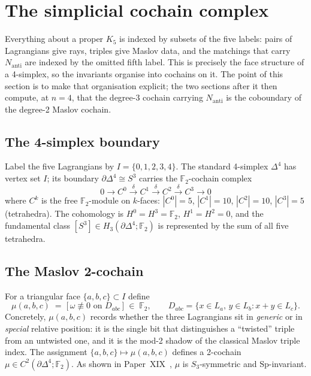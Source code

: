 \documentclass[11pt,a4paper]{article}
\theoremstyle{remark}
\newcommand{\F}{\mathbb{F}}
\newcommand{\Sp}{\mathrm{Sp}}
\newcommand{\Nanti}{N_{\mathrm{anti}}}
\begin{document}
\section{The simplicial cochain complex}\label{sec:setup}

Everything about a proper $K_5$ is indexed by subsets of the five labels:
pairs of Lagrangians give rays, triples give Maslov data, and the matchings
that carry $\Nanti$ are indexed by the omitted fifth label.  This is precisely
the face structure of a 4-simplex, so the invariants organise into cochains on
it.  The point of this section is to make that organisation explicit; the two
sections after it then compute, at $n=4$, that the degree-3 cochain carrying
$\Nanti$ is the coboundary of the degree-2 Maslov cochain.

\subsection{The 4-simplex boundary}

Label the five Lagrangians by $I=\{0,1,2,3,4\}$.  The standard 4-simplex
$\Delta^4$ has vertex set $I$; its boundary $\partial\Delta^4\cong S^3$ carries
the $\F_2$-cochain complex
\[
  0\to C^0 \xrightarrow{\,\delta\,} C^1 \xrightarrow{\,\delta\,} C^2
    \xrightarrow{\,\delta\,} C^3 \to 0
\]
where $C^k$ is the free $\F_2$-module on $k$-faces:
$|C^0|=5$, $|C^1|=10$, $|C^2|=10$, $|C^3|=5$ (tetrahedra).
The cohomology is $H^0=H^3=\F_2$, $H^1=H^2=0$, and the
fundamental class $[S^3]\in H_3(\partial\Delta^4;\F_2)$ is represented by the
sum of all five tetrahedra.

\subsection{The Maslov 2-cochain}

For a triangular face $\{a,b,c\}\subset I$ define
\begin{equation}\label{eq:maslov}
  \mu(a,b,c) \;=\; \bigl[\,\omega\not\equiv 0 \text{ on }
    D_{abc}\,\bigr] \;\in\;\F_2,
  \qquad
  D_{abc}=\{x\in L_a,\,y\in L_b : x+y\in L_c\}.
\end{equation}
Concretely, $\mu(a,b,c)$ records whether the three Lagrangians sit in
\emph{generic} or in \emph{special} relative position: it is the single bit
that distinguishes a ``twisted'' triple from an untwisted one, and it is the
mod-2 shadow of the classical Maslov triple index.
The assignment $\{a,b,c\}\mapsto\mu(a,b,c)$ defines a 2-cochain
$\mu\in C^2(\partial\Delta^4;\F_2)$.
As shown in Paper~XIX~\cite{PaperXIX}, $\mu$ is $S_3$-symmetric and
$\Sp$-invariant.
\end{document}
